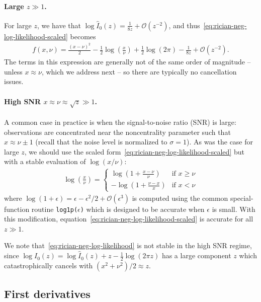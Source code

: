 \documentclass{article}
\begin{document}
\paragraph{Large $z \gg 1$.}

For large $z$, we have that $\log \hat{I}_0(z) = \frac{1}{8 z} + \mathcal{O}(z^{-2})$, and thus~\eqref{eq:rician-neg-log-likelihood-scaled} becomes
%
\begin{align}
  f(x, \nu) = \frac{(x-\nu)^2}{2} - \frac{1}{2}\log\left(\frac{x}{\nu}\right) + \frac{1}{2}\log(2\pi) - \frac{1}{8 z} + \mathcal{O}(z^{-2}).
\end{align}
%
The terms in this expression are generally not of the same order of magnitude -- unless $x \approx \nu$, which we address next -- so there are typically no cancellation issues.

\paragraph{High SNR $x \approx \nu \approx \sqrt{z} \gg 1$.}

A common case in practice is when the signal-to-noise ratio (SNR) is large:
observations are concentrated near the noncentrality parameter such that $x \approx \nu \pm 1$ (recall that the noise level is normalized to $\sigma=1$).
As was the case for large $z$, we should use the scaled form~\eqref{eq:rician-neg-log-likelihood-scaled} but with a stable evaluation of $\log(x/\nu)$:
%
\begin{align}
  \log\left(\frac{x}{\nu}\right) = \begin{cases}
    \log\left(1 + \frac{x-\nu}{\nu}\right) & \text{if } x \ge \nu \\
    -\log\left(1 + \frac{\nu-x}{x}\right)  & \text{if } x < \nu
  \end{cases}
\end{align}
%
where $\log(1 + \epsilon) = \epsilon - \epsilon^2/2 + \mathcal{O}(\epsilon^3)$ is computed using the common special-function routine \texttt{log1p($\epsilon$)} which is designed to be accurate when $\epsilon$ is small.
With this modification, equation~\eqref{eq:rician-neg-log-likelihood-scaled} is accurate for all $z \gg 1$.

We note that~\eqref{eq:rician-neg-log-likelihood} is not stable in the high SNR regime, since $\log I_0(z) = \log \hat{I}_0(z) + z - \frac{1}{2}\log(2\pi z)$ has a large component $z$ which catastrophically cancels with $(x^2 + \nu^2) / 2 \approx z$.

\subsection{First derivatives}
\end{document}
